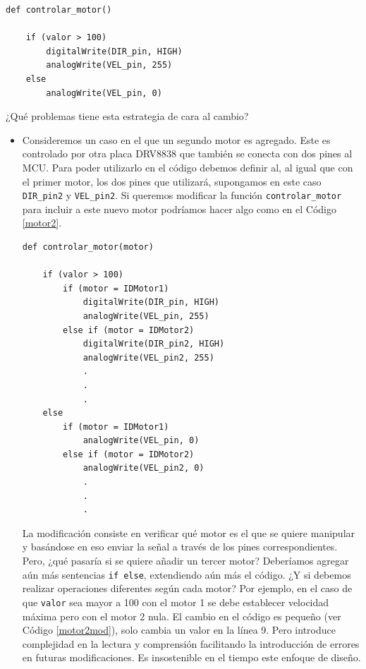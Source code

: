\begin{lstlisting}[caption=Ejemplo uso del motor DC.,label={listingMotor}]
def controlar_motor()

	if (valor > 100)
    	digitalWrite(DIR_pin, HIGH)
	    analogWrite(VEL_pin, 255)
	else
	    analogWrite(VEL_pin, 0)

\end{lstlisting}

¿Qué problemas tiene esta estrategia de cara al cambio?
\begin{itemize}
	\item Consideremos un caso en el que un segundo motor es agregado. Este es controlado por otra placa \gls{DRV8838} que también se conecta con dos pines al \gls{MCU}. Para poder utilizarlo en el código debemos definir al, al igual que con el primer motor, los dos pines que utilizará, supongamos en este caso \verb|DIR_pin2| y \verb|VEL_pin2|. Si queremos modificar la función \verb|controlar_motor| para incluir a este nuevo motor podríamos hacer algo como en el Código \ref{motor2}.
	
\begin{lstlisting}[caption=Extención de la función controlar\_motor para controlar dos motores.,label={motor2}]
def controlar_motor(motor)

	if (valor > 100)
		if (motor = IDMotor1)
    		digitalWrite(DIR_pin, HIGH)
	    	analogWrite(VEL_pin, 255)
	    else if (motor = IDMotor2)
	    	digitalWrite(DIR_pin2, HIGH)
	    	analogWrite(VEL_pin2, 255)
	    	.
	    	.
	    	.
	else
		if (motor = IDMotor1)
	    	analogWrite(VEL_pin, 0)
	    else if (motor = IDMotor2)
	    	analogWrite(VEL_pin2, 0)
	    	.
	    	.
	    	.

\end{lstlisting}
	
La modificación consiste en verificar qué motor es el que se quiere manipular y basándose en eso enviar la señal a través de los pines correspondientes. Pero, ¿qué pasaría si se quiere añadir un tercer motor? Deberíamos agregar aún más sentencias \verb|if else|, extendiendo aún más el código. ¿Y si debemos realizar operaciones diferentes según cada motor? Por ejemplo, en el caso de que \verb|valor| sea mayor a 100 con el motor 1 se debe establecer velocidad máxima pero con el motor 2 nula. El cambio en el código es pequeño (ver Código \ref{motor2mod}), solo cambia un valor en la línea 9. Pero introduce complejidad en la lectura y comprensión facilitando la introducción de errores en futuras modificaciones. Es insostenible en el tiempo este enfoque de diseño.


\end{itemize}
